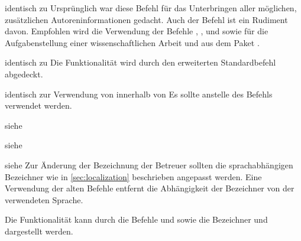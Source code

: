 \begin{Declaration}{}{%
  identisch zu %
}
\printdeclarationlist%
%
Ursprünglich war diese Befehl für das Unterbringen aller möglichen, 
zusätzlichen Autoreninformationen gedacht. Auch der Befehl  
ist ein Rudiment davon. Empfohlen wird die Verwendung der Befehle 
, ,  und 
 sowie für die Aufgabenstellung einer 
wissenschaftlichen Arbeit  und  aus dem Paket 
.
\end{Declaration}

\begin{Declaration}{}{%
  identisch zu %
}
\printdeclarationlist%
%
Die Funktionalität wird durch den erweiterten Standardbefehl  
abgedeckt.
\end{Declaration}

\begin{Declaration}{}{%
  identisch zur Verwendung von  innerhalb von %
}
\printdeclarationlist%
%
Es sollte 
anstelle des Befehls  verwendet werden.
\end{Declaration}

\begin{Declaration}{}{%
  siehe %
}
\begin{Declaration}{}{%
  siehe %
}
\begin{Declaration}{}{%
  siehe %
}
\printdeclarationlist%
%
Zur Änderung der Bezeichnung der Betreuer sollten die sprachabhängigen 
Bezeichner wie in \autoref{sec:localization} beschrieben angepasst werden. Eine 
Verwendung der alten Befehle entfernt die Abhängigkeit der Bezeichner von der 
verwendeten Sprache.
\end{Declaration}
\end{Declaration}
\end{Declaration}

\begin{Declaration}{}
\printdeclarationlist%
%
Die Funktionalität kann durch die Befehle  und 
 sowie die Bezeichner  und 
 dargestellt werden.
\end{Declaration}

